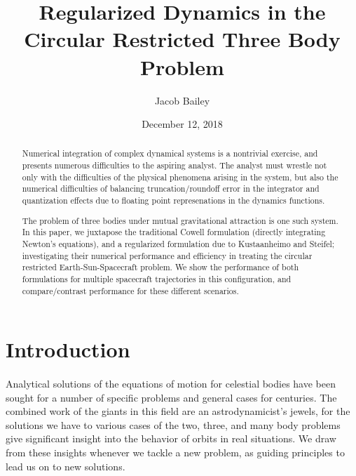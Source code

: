 \documentclass[11pt,twoside,letterpaper]{article}
\begin{document}
\title{Regularized Dynamics in the Circular Restricted Three Body
  Problem}

\author{Jacob Bailey}
\date{December 12, 2018}
\maketitle

\begin{abstract}
  Numerical integration of complex dynamical systems is a nontrivial
  exercise, and presents numerous difficulties to the aspiring
  analyst. The analyst must wrestle not only with the difficulties of
  the physical phenomena arising in the system, but also the numerical
  difficulties of balancing truncation/roundoff error in the
  integrator and quantization effects due to floating point
  represenations in the dynamics functions.

  The problem of three bodies under mutual gravitational attraction is
  one such system. In this paper, we juxtapose the traditional Cowell
  formulation (directly integrating Newton's equations), and a
  regularized formulation due to Kustaanheimo and Steifel;
  investigating their numerical performance and efficiency in treating
  the circular restricted Earth-Sun-Spacecraft problem. We show the
  performance of both formulations for multiple spacecraft
  trajectories in this configuration, and compare/contrast performance
  for these different scenarios. 

  \end{abstract}

  \section {Introduction}
  \paragraph{}
    Analytical solutions of the equations of motion for celestial
    bodies have been sought for a number of specific problems and
    general cases for centuries. The combined work of the giants in
    this field are an astrodynamicist’s jewels, for the solutions we
    have to various cases of the two, three, and many body problems
    give significant insight into the behavior of orbits in real
    situations. We draw from these insights whenever we tackle a new
    problem, as guiding principles to lead us on to new solutions.
\end{document}
